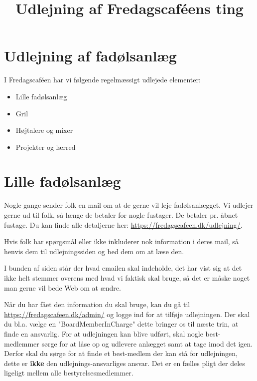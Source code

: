 

\title{Udlejning af Fredagscaféens ting}
\date{}



\maketitle

\section{Udlejning af fadølsanlæg}

I Fredagscaféen har vi følgende regelmæssigt udlejede elementer:
\begin{itemize}
	\item Lille fadølsanlæg
	\item Gril
	\item Højtalere og mixer
	\item Projekter og lærred
\end{itemize}

\section{Lille fadølsanlæg}
Nogle gange sender folk en mail om at de gerne vil leje fadølsanlægget. Vi udlejer gerne ud til folk, så længe de betaler for nogle fustager. De betaler pr. åbnet fustage. Du kan finde alle detaljerne her: \url{https://fredagscafeen.dk/udlejning/}.

Hvis folk har spørgsmål eller ikke inkluderer nok information i deres mail, så henvis dem til udlejningssiden og bed dem om at læse den.

I bunden af siden står der hvad emailen skal indeholde, det har vist sig at det ikke helt stemmer overens med hvad vi faktisk skal bruge, så det er måske noget man gerne vil bede Web om at ændre.

Når du har fået den information du skal bruge, kan du gå til \url{https://fredagscafeen.dk/admin/} og logge ind for at tilføje udlejningen. Der skal du bl.a. vælge en "BoardMemberInCharge" dette bringer os til næste trin, at finde en ansvarlig. For at udlejningen kan blive udført, skal nogle best-medlemmer sørge for at låse op og udlevere anlægget samt at tage imod det igen. Derfor skal du sørge for at finde et best-medlem der kan stå for udlejningen, dette er \textbf{ikke} den udlejnings-ansvarliges ansvar. Det er en fælles pligt der deles ligeligt mellem alle bestyrelsesmedlemmer.

